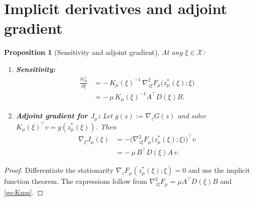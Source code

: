 \documentclass[11pt]{article}
\newtheorem{proposition}{Proposition}
\theoremstyle{remark}
\begin{document}
\section{Implicit derivatives and adjoint gradient}
\begin{proposition}[Sensitivity and adjoint gradient]
\label{prop:implicit}
At any $\xi\in\mathcal X$:
\begin{enumerate}[leftmargin=2em,label=(\roman*)]
\item \textbf{Sensitivity:}
\begin{align*}
\frac{\partial z^*_\mu}{\partial \xi}
&= -\,K_\mu(\xi)^{-1}\,\nabla^2_{z\xi}F_\mu\big(z^*_\mu(\xi);\xi\big) \\
&= -\,\mu\,K_\mu(\xi)^{-1}A^\top D(\xi)B.
\end{align*}
\item \textbf{Adjoint gradient for $J_\mu$:}
Let $g(z):=\nabla_z G(z)$ and solve $K_\mu(\xi)^\top v = g(z^*_\mu(\xi))$. Then
\begin{align*}
\nabla_\xi J_\mu(\xi)
&= -\big(\nabla^2_{z\xi} F_\mu\big(z^*_\mu(\xi);\xi\big)\big)^\top v \\
&= -\,\mu\,B^\top D(\xi)A\,v.
\end{align*}
\end{enumerate}
\end{proposition}
\begin{proof}
Differentiate the stationarity $\nabla_z F_\mu(z^*_\mu(\xi);\xi)=0$ and use the implicit function theorem. The expressions follow from $\nabla^2_{z\xi}F_\mu=\mu A^\top D(\xi) B$ and \eqref{eq:Kmu}.
\end{proof}
\end{document}
